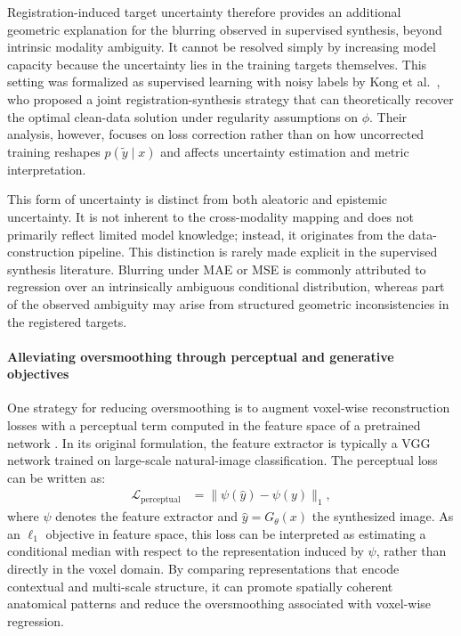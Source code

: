 \documentclass[lettersize,journal]{IEEEtran}
\begin{document}
Registration-induced target uncertainty therefore provides an additional geometric explanation for the blurring observed in supervised synthesis, beyond intrinsic modality ambiguity. It cannot be resolved simply by increasing model capacity because the uncertainty lies in the training targets themselves. This setting was formalized as supervised learning with noisy labels by Kong et al.~\cite{kong2021breaking}, who proposed a joint registration-synthesis strategy that can theoretically recover the optimal clean-data solution under regularity assumptions on $\phi$. Their analysis, however, focuses on loss correction rather than on how uncorrected training reshapes $p(\tilde{y}\mid x)$ and affects uncertainty estimation and metric interpretation.

This form of uncertainty is distinct from both aleatoric and epistemic uncertainty. It is not inherent to the cross-modality mapping and does not primarily reflect limited model knowledge; instead, it originates from the data-construction pipeline. This distinction is rarely made explicit in the supervised synthesis literature. Blurring under MAE or MSE is commonly attributed to regression over an intrinsically ambiguous conditional distribution, whereas part of the observed ambiguity may arise from structured geometric inconsistencies in the registered targets.

\paragraph{Alleviating oversmoothing through perceptual and generative objectives}
One strategy for reducing oversmoothing is to augment voxel-wise reconstruction losses with a perceptual term computed in the feature space of a pretrained network \cite{johnson2016perceptual}. In its original formulation, the feature extractor is typically a VGG network trained on large-scale natural-image classification. The perceptual loss can be written as:
\begin{equation}
\begin{aligned}
    \mathcal{L}_{\mathrm{perceptual}}
    &= \|\psi(\hat{y}) - \psi(y)\|_1 ,
\end{aligned}
\end{equation}
where $\psi$ denotes the feature extractor and $\hat{y}=G_\theta(x)$ the synthesized image. As an $\ell_1$ objective in feature space, this loss can be interpreted as estimating a conditional median with respect to the representation induced by $\psi$, rather than directly in the voxel domain. By comparing representations that encode contextual and multi-scale structure, it can promote spatially coherent anatomical patterns and reduce the oversmoothing associated with voxel-wise regression.
\end{document}
